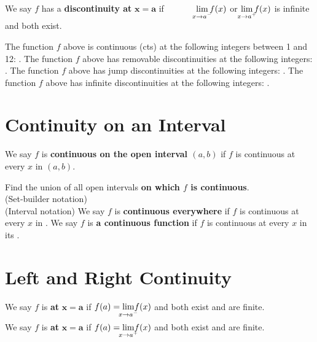 \documentclass[10pt, answers]{exam}
\begin{document}
\begin{questions}
\question We say $f$
  has a  \textbf{discontinuity at} $\pmb{x=a}$ if
  $\phantom{f(a)={}}\lim\limits_{\mathclap{x\to a^-}}f(x)$ or $ \lim\limits_{\mathclap{x\to a^+}}f(x)$
  is infinite and both exist.

\setlength\fillinlinelength{1.5in}
\question The function $f$ above is continuous (cts) at the following integers between 1 and 12: \fillin[1].
\question The function $f$ above has removable discontinuities at the following integers: \fillin[2, 3].
\question The function $f$ above has jump discontinuities at the following integers: \fillin[4, 5, 6, 7].
\question The function $f$ above has infinite discontinuities at the following integers: \fillin[8, 9, 10, 11, 12].


\section{Continuity on an Interval}
\vspace{-4mm}
\question We say $f$ is 
  \textbf{continuous on the open interval
  \boldmath $(a,b)$}
  if $f$ is continuous at every $x$ 
  in $(a,b)$.
  \par Find the union of all open intervals
  \textbf{on which $f$
  is continuous}.
  \\[3ex] (Set-builder notation) 
  \\[3ex] (Interval notation) 
\question We say $f$ is \textbf{continuous everywhere}
  if $f$ is continuous at every $x$ in \fillin[\pmb{$(-\infty,\infty)$}].
\question We say $f$ is 
  \textbf{a continuous function} 
  if $f$ is continuous at every
  $x$ in its \fillin[domain].

\vspace{-1mm}
\section{Left and Right Continuity}
\vspace{-4mm}

\question We say $f$
  is  \textbf{at} $\pmb{x=a}$ if
  ${f(a) ={}} \smash{\lim\limits_{\mathclap{x\to a^-}}}f(x)$
  and both exist and are finite.
  
\question We say $f$
  is  \textbf{at} $\pmb{x=a}$ if
  ${f(a) ={}} \smash{\lim\limits_{\mathclap{x\to a^+}}}f(x)$
  and both exist and are finite.


\end{questions}
\end{document}

